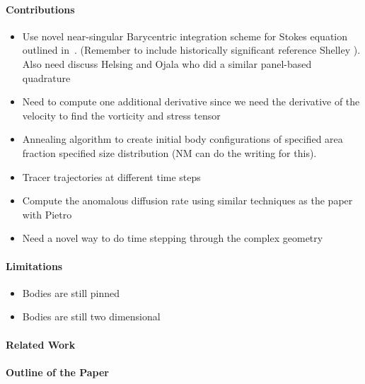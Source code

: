 \documentclass[preprint, 10pt]{elsarticle}
\begin{document}
\paragraph{Contributions}
\begin{itemize}
  \item Use novel near-singular Barycentric integration scheme for
    Stokes equation outlined in~\cite{bar-wu-vee2015}. (Remember to
    include historically significant reference Shelley
    \cite{baker1986boundary}).  Also need discuss Helsing and Ojala who
    did a similar panel-based quadrature~\cite{hel-oja2008}
  \item Need to compute one additional derivative since we need the
    derivative of the velocity to find the vorticity and stress tensor
  \item Annealing algorithm to create initial body configurations of specified area fraction specified size distribution (NM can do the writing for this).
  \item Tracer trajectories at different time steps
  \item Compute the anomalous diffusion rate using similar techniques as
    the paper with Pietro~\cite{dea-qua-bir-jua2018}
  \item Need a novel way to do time stepping through the complex
    geometry
\end{itemize}

\paragraph{Limitations}
\begin{itemize}
  \item Bodies are still pinned
  \item Bodies are still two dimensional
\end{itemize}

\paragraph{Related Work}

\paragraph{Outline of the Paper}

\end{document}
